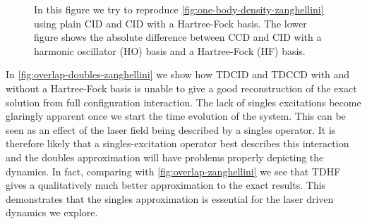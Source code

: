 \begin{figure}
            \caption{In this figure we try to reproduce
            \autoref{fig:one-body-density-zanghellini} using plain CID and CID
            with a Hartree-Fock basis.
            The lower figure shows the absolute difference between CCD and CID
            with a harmonic oscillator (HO) basis and a Hartree-Fock (HF)
            basis.}
            \label{fig:one-body-density-doubles-zanghellini}
        \end{figure}

        In \autoref{fig:overlap-doubles-zanghellini} we show how TDCID and TDCCD
        with and without a Hartree-Fock basis is unable to give a good
        reconstruction of the exact solution from full configuration
        interaction.
        The lack of singles excitations become glaringly apparent once we start
        the time evolution of the system.
        This can be seen as an effect of the laser field being described by a
        singles operator.
        It is therefore likely that a singles-excitation operator best describes
        this interaction and the doubles approximation will have problems
        properly depicting the dynamics.
        In fact, comparing with \autoref{fig:overlap-zanghellini} we see that
        TDHF gives a qualitatively much better approximation to the exact
        results.
        This demonstrates that the singles approximation is essential for the
        laser driven dynamics we explore.

